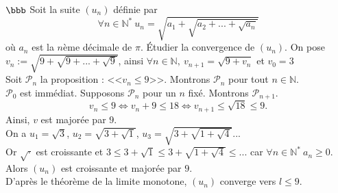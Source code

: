 \documentclass[11pt]{article}
\begin{document}
\begin{exercice}{$\bbb$}{}
    Soit la suite $(u_n)$ définie par
    \begin{equation*}
        \forall n\in\mathbb{N}^* ~ u_n = \sqrt{a_1 + \sqrt{a_2 + ... + \sqrt{a_n}}}
    \end{equation*}
    où $a_n$ est la $n$ème décimale de $\pi$. Étudier la convergence de $(u_n)$.
    \tcblower
    On pose $v_n := \sqrt{9 + \sqrt{9 + ... + \sqrt{9}}}$, ainsi $\forall{n\in\mathbb{N}},~v_{n+1} = \sqrt{9 + v_n}$ et $v_0 = 3$\\
    Soit $\mathcal{P}_n$ la proposition : <<$v_n \leq 9$>>. Montrons $\mathcal{P}_n$ pour tout $n\in\mathbb{N}$.\\
    $\mathcal{P}_0$ est immédiat. Supposons $\mathcal{P}_n$ pour un $n$ fixé. Montrons $\mathcal{P}_{n+1}$.
    \begin{equation*}
        v_n \leq 9 \iff v_n + 9 \leq 18 \iff v_{n+1} \leq \sqrt{18} \leq 9.
    \end{equation*}
    Ainsi, $v$ est majorée par $9$.\\
    On a $u_1 = \sqrt{3}$, $u_2 = \sqrt{3 + \sqrt{1}}$, $u_3 = \sqrt{3 + \sqrt{1 + \sqrt{4}}}...$\\
    Or $\sqrt{\cdot}$ est croissante et $3 \leq 3 + \sqrt{1} \leq 3 + \sqrt{1 + \sqrt{4}} \leq ...$ car $\forall{n\in\mathbb{N}^*} ~ a_n \geq 0$.\\
    Alors $(u_n)$ est croissante et majorée par $9$.\\
    D'après le théorème de la limite monotone, $(u_n)$ converge vers $l\leq9$.
\end{exercice}
\end{document}
